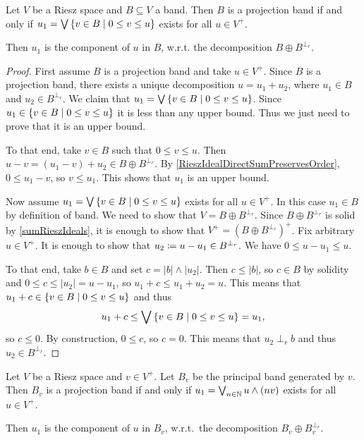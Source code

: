 \begin{proposition} \label{projectionBandCriterion}
Let $V$ be a Riesz space and $B\subseteq V$ a band. Then $B$ is a projection band \textup{if and only if} $u_1 = \bigvee \setbuilder{v\in B}{0\leq v\leq u}$ exists for all $u\in V^+$.

Then $u_1$ is the component of $u$ in $B$, w.r.t. the decomposition $B\oplus B^{\perp_r}$.
\end{proposition}
\begin{proof}
First assume $B$ is a projection band and take $u\in V^+$. Since $B$ is a projection band, there exists a unique decomposition $u = u_1 + u_2$, where $u_1 \in B$ and $u_2 \in B^{\perp_r}$. We claim that $u_1 = \bigvee \setbuilder{v\in B}{0\leq v\leq u}$. Since $u_1 \in \setbuilder{v\in B}{0\leq v\leq u}$ it is less than any upper bound. Thus we just need to prove that it is an upper bound.

To that end, take $v\in B$ such that $0\leq v\leq u$. Then $u-v = (u_1 - v) + u_2 \in B\oplus B^{\perp_r}$. By \ref{RieszIdealDirectSumPreservesOrder}, $0\leq u_1 - v$, so $v\leq u_1$. This shows that $u_1$ is an upper bound.

Now assume $u_1 = \bigvee \setbuilder{v\in B}{0\leq v\leq u}$ exists for all $u\in V^+$. In this case $u_1\in B$ by definition of band. We need to show that $V = B\oplus B^{\perp_r}$. Since $B\oplus B^{\perp_r}$ is solid by \ref{sumRieszIdeals}, it is enough to show that $V^+ = (B\oplus B^{\perp_r})^+$.  Fix arbitrary $u\in V^+$. It is enough to show that $u_2 \coloneqq u - u_1 \in B^{\perp_r}$. We have $0\leq u - u_1 \leq u$.

To that end, take $b\in B$ and set $c = |b|\wedge |u_2|$. Then $c\leq |b|$, so $c\in B$ by solidity and $0\leq c \leq |u_2| = u-u_1$, so $u_1 + c \leq u_1 + u_2 = u$. This means that $u_1 + c\in \setbuilder{v\in B}{0\leq v\leq u}$ and thus
\[ u_1 + c \leq \bigvee \setbuilder{v\in B}{0\leq v\leq u} = u_1, \]
so $c\leq 0$. By construction, $0\leq c$, so $c = 0$. This means that $u_2 \perp_r b$ and thus $u_2\in B^{\perp_r}$.
\end{proof}
\begin{corollary} \label{principalProjectionBandCriterion}
Let $V$ be a Riesz space and $v\in V^+$. Let $B_v$ be the principal band generated by $v$. Then $B_v$ is a projection band \textup{if and only if} $u_1 = \bigvee_{n\in \mathbb{N}} u\wedge (nv)$ exists for all $u\in V^+$.

Then $u_1$ is the component of $u$ in $B_v$, w.r.t.\ the decomposition $B_v \oplus B_v^{\perp_r}$.
\end{corollary}
